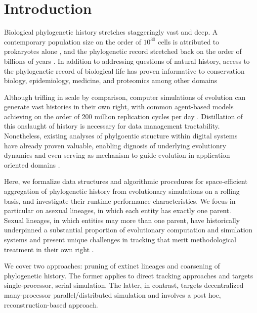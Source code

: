 \section{Introduction} \label{sec:introduction}

Biological phylogenetic history stretches staggeringly vast and deep.
A contemporary population size on the order of $10^{30}$ cells is attributed to prokaryotes alone \citep{whitman1998prokaryotes}, and the phylogenetic record stretched back on the order of billions of years \citep{arndt2012processes}.
In addition to addressing questions of natural history, access to the phylogenetic record of biological life has proven informative to conservation biology, epidemiology, medicine, and proteomics among other domains \citep{STAMATAKIS2005phylogenetics}

Although trifling in scale by comparison, computer simulations of evolution can generate vast histories in their own right, with common agent-based models achieving on the order of 200 million replication cycles per day \citep{ofria2009avida}.
Distillation of this onslaught of history is necessary for data management tractability.
Nonetheless, existing analyses of phylgoentic structure within digital systems have already proven valuable, enabling dignosis of underlying evolutionry dynamics \cite{moreno2023toward,hernandez2022can,shahbandegan2022untangling} and even serving as mechanism to guide evolution in application-oriented domains \cite{lalejini2024methods,murphy2008simple,burke2003increased}.

Here, we formalize data structures and algorithmic procedures for space-efficient aggregation of phylogenetic history from evolutionary simulations on a rolling basis, and investigate their runtime performance characteristics.
We focus in particular on asexual lineages, in which each entity has exactly one parent.
Sexual lineages, in which entities may more than one parent, have historically underpinned a substantial proportion of evolutionary computation and simulation systems \citep{koza1994genetic,jefferson1990evolution} and present unique challenges in tracking that merit methodological treatment in their own right \citep{godin2019apoget,moreno2024methods,mcphee2018detailed}.

We cover two approaches: pruning of extinct lineages and coarsening of phylogenetic history.
The former applies to direct tracking approaches and targets single-processor, serial simulation.
The latter, in contrast, targets decentralized many-processor parallel/distributed simulation and involves a post hoc, reconstruction-based approach.

